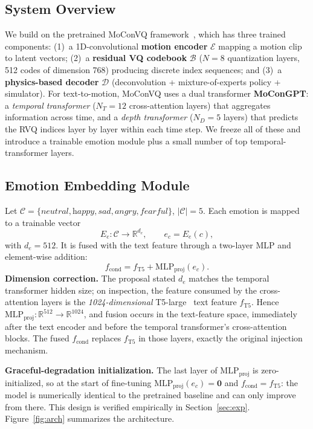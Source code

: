\documentclass[conference]{IEEEtran}
\begin{document}
\subsection{System Overview}
We build on the pretrained MoConVQ framework~\cite{yao2023moconvq}, which has
three trained components: (1)~a 1D-convolutional \textbf{motion encoder}
$\mathcal{E}$ mapping a motion clip to latent vectors; (2)~a \textbf{residual
VQ codebook} $\mathcal{B}$ ($N=8$ quantization layers, 512 codes of dimension
768) producing discrete index sequences; and (3)~a \textbf{physics-based
decoder} $\mathcal{D}$ (deconvolution + mixture-of-experts policy + simulator).
For text-to-motion, MoConVQ uses a dual transformer \textbf{MoConGPT}: a
\emph{temporal transformer} ($N_T=12$ cross-attention layers) that aggregates
information across time, and a \emph{depth transformer} ($N_D=5$ layers) that
predicts the RVQ indices layer by layer within each time step. We freeze all
of these and introduce a trainable emotion module plus a small number of
top temporal-transformer layers.

\subsection{Emotion Embedding Module}
Let $\mathcal{C}=\{\textit{neutral},\textit{happy},\textit{sad},\textit{angry},
\textit{fearful}\}$, $|\mathcal{C}|=5$. Each emotion is mapped to a trainable
vector
\begin{equation}
  E_e:\mathcal{C}\rightarrow\mathbb{R}^{d_e},\qquad e_c=E_e(c),
\end{equation}
with $d_e=512$. It is fused with the text feature through a two-layer MLP and
element-wise addition:
\begin{equation}
  f_{\text{cond}} = f_{\text{T5}} + \text{MLP}_{\text{proj}}(e_c).
  \label{eq:fuse}
\end{equation}
\textbf{Dimension correction.} The proposal stated $d_e$ matches the temporal
transformer hidden size; on inspection, the feature consumed by the
cross-attention layers is the \emph{1024-dimensional} T5-large~\cite{raffel2020t5}
text feature $f_{\text{T5}}$. Hence $\text{MLP}_{\text{proj}}:\mathbb{R}^{512}
\!\rightarrow\!\mathbb{R}^{1024}$, and fusion occurs in the text-feature space,
immediately after the text encoder and before the temporal transformer's
cross-attention blocks. The fused $f_{\text{cond}}$ replaces $f_{\text{T5}}$ in
those layers, exactly the original injection mechanism.

\textbf{Graceful-degradation initialization.} The last layer of
$\text{MLP}_{\text{proj}}$ is zero-initialized, so at the start of fine-tuning
$\text{MLP}_{\text{proj}}(e_c)=\mathbf{0}$ and $f_{\text{cond}}=f_{\text{T5}}$:
the model is numerically identical to the pretrained baseline and can only
improve from there. This design is verified empirically in
Section~\ref{sec:exp}. Figure~\ref{fig:arch} summarizes the architecture.
\end{document}
